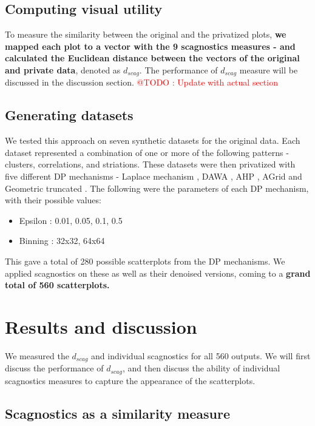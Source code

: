 \documentclass[journal]{vgtc}                     %
\begin{document}
\subsection{Computing visual utility}
To measure the similarity between the original and the privatized plots, \textbf{we mapped each plot to a vector with the 9 scagnostics measures - and calculated the Euclidean distance between the vectors of the original and private data}, denoted as $d_{scag}$. The performance of $d_{scag}$ measure will be discussed in the discussion section. \textcolor{red}{@TODO : Update with actual section}

\subsection{Generating datasets}
We tested this approach on seven synthetic datasets for the original data. Each dataset represented a combination of one or more of the following patterns - clusters, correlations, and striations. These datasets were then privatized with five different DP mechanisms - Laplace mechanism \cite{Dwork2006}, DAWA \cite{li2014}, AHP \cite{Zhang2014}, AGrid \cite{Li2013} and Geometric truncated \cite{Ghosh2009}. The following were the parameters of each DP mechanism, with their possible values:
\begin{itemize}
    \item Epsilon : 0.01, 0.05, 0.1, 0.5
    \item Binning : 32x32, 64x64
\end{itemize}
This gave a total of 280 possible scatterplots from the DP mechanisms. We applied scagnostics on these as well as their denoised versions, coming to a \textbf{grand total of 560 scatterplots. }

\section{Results and discussion}
We measured the $d_{scag}$ and individual scagnostics for all 560 outputs. We will first discuss the performance of $d_{scag}$, and then discuss the ability of individual scagnostics measures to capture the appearance of the scatterplots.

\subsection{Scagnostics as a similarity measure}
\end{document}
